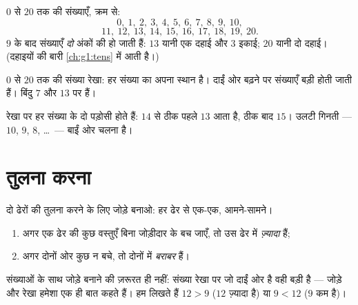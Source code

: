 \begin{example}[पढ़ना और लिखना]\label{ex:g1:counting:writing}
$0$ से $20$ तक की संख्याएँ, क्रम से:
\[
0,\ 1,\ 2,\ 3,\ 4,\ 5,\ 6,\ 7,\ 8,\ 9,\ 10,
\]
\[
11,\ 12,\ 13,\ 14,\ 15,\ 16,\ 17,\ 18,\ 19,\ 20 .
\]
$9$ के बाद संख्याएँ \emph{दो} अंकों की हो जाती हैं: $13$ यानी एक
दहाई और $3$ इकाई; $20$ यानी दो दहाई। (दहाइयों की बारी
\cref{ch:g1:tens} में आती है।)
\end{example}

\begin{omfigure}

{\small $0$ से $20$ तक की संख्या रेखा: हर संख्या का अपना स्थान है।
दाईं ओर बढ़ने पर संख्याएँ बड़ी होती जाती हैं। बिंदु $7$ और $13$ पर हैं।}
\end{omfigure}

\begin{example}[ठीक पहले, ठीक बाद]\label{ex:g1:counting:neighbors}
रेखा पर हर संख्या के दो पड़ोसी होते हैं: $14$ से ठीक पहले $13$ आता
है, ठीक बाद $15$। उलटी गिनती --- $10$, $9$, $8$,
\dots\ --- बाईं ओर चलना है।
\end{example}

\section{तुलना करना}

\begin{method}[किसके पास ज़्यादा हैं?]\label{met:g1:counting:compare}
दो ढेरों की तुलना करने के लिए जोड़े बनाओ: हर ढेर से एक-एक,
आमने-सामने।
\begin{enumerate}
  \item अगर एक ढेर की कुछ वस्तुएँ बिना जोड़ीदार के बच जाएँ, तो
        उस ढेर में \emph{ज़्यादा} हैं;
  \item अगर दोनों ओर कुछ न बचे, तो दोनों में \emph{बराबर}
        हैं।
\end{enumerate}
संख्याओं के साथ जोड़े बनाने की ज़रूरत ही नहीं: संख्या रेखा पर जो
दाईं ओर है वही बड़ी है --- जोड़े और रेखा हमेशा एक ही बात कहते हैं।
हम लिखते हैं $12 > 9$ ($12$ ज़्यादा है) या $9 < 12$ ($9$ कम है)।
\end{method}

